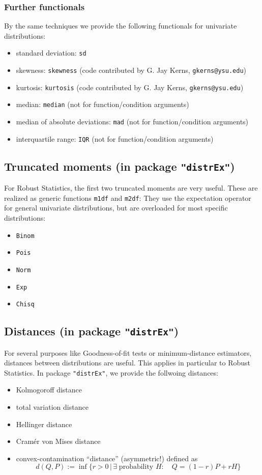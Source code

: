 \documentclass[11pt]{article}
\newcommand{\code}[1]{{\tt #1}}
\newcommand{\pkg}[1]{{\tt "#1"}}
\begin{document}
\subsubsection{Further functionals}
By the same techniques we provide the following functionals for univariate 
distributions:
\begin{itemize}
  \item standard deviation: \code{sd}
  \item skewness: \code{skewness}  
  (code contributed by G. Jay Kerns, {\small \tt gkerns@ysu.edu})
  \item kurtosis: \code{kurtosis} 
   (code contributed by G. Jay Kerns, {\small \tt gkerns@ysu.edu})
  \item median: \code{median} (not for function/condition arguments)
  \item median of absolute deviations: \code{mad} (not for function/condition 
  arguments)
  \item interquartile range: \code{IQR} (not for function/condition arguments)
\end{itemize}
%
\subsection[Truncated moments (in package distrEx)]{Truncated moments 
(in package \pkg{distrEx})}\label{m1df}
%
For Robust Statistics, the first two truncated moments are very useful. These 
are realized as generic functions \code{m1df} and \code{m2df}: They use the 
expectation operator for general univariate distributions, but are overloaded 
for most specific distributions:
\begin{itemize}
  \item \code{Binom}
  \item \code{Pois}
  \item \code{Norm}
  \item \code{Exp}
  \item \code{Chisq}
\end{itemize}
%
\subsection[Distances (in package distrEx)]{Distances (in package %
 \pkg{distrEx})}\label{Distances}
%
For several purposes like Goodness-of-fit tests or minimum-distance estimators, 
distances between distributions are useful. This applies in particular to Robust 
Statistics. In package \pkg{distrEx}, we provide the follwoing distances:
\begin{itemize}
  \item Kolmogoroff distance
  \item total variation distance
  \item Hellinger distance
  \item Cram\'er von Mises distance
  \item convex-contamination ``distance'' (asymmetric!) defined as
  $$
d(Q,P):=\inf\{r>0\,|\, \exists \;\mbox{probability } H:\quad Q=(1-r)P+rH \}
  $$
\end{itemize}
\end{document}
